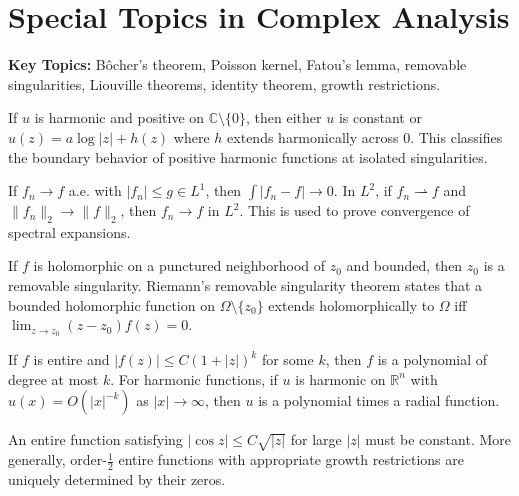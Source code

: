 \section{Special Topics in Complex Analysis}

\textbf{Key Topics:} Bôcher's theorem, Poisson kernel, Fatou's lemma, removable singularities, Liouville theorems, identity theorem, growth restrictions.

\begin{example}
If $u$ is harmonic and positive on $\mathbb{C} \setminus \{0\}$, then either $u$ is constant or $u(z) = a\log|z| + h(z)$ where $h$ extends harmonically across $0$. This classifies the boundary behavior of positive harmonic functions at isolated singularities.
\end{example}

\begin{example}
If $f_n \to f$ a.e. with $|f_n| \leq g \in L^1$, then $\int |f_n - f| \to 0$. In $L^2$, if $f_n \rightharpoonup f$ and $\|f_n\|_2 \to \|f\|_2$, then $f_n \to f$ in $L^2$. This is used to prove convergence of spectral expansions.
\end{example}

\begin{example}
If $f$ is holomorphic on a punctured neighborhood of $z_0$ and bounded, then $z_0$ is a removable singularity. Riemann's removable singularity theorem states that a bounded holomorphic function on $\Omega \setminus \{z_0\}$ extends holomorphically to $\Omega$ iff $\lim_{z\to z_0} (z-z_0)f(z) = 0$.
\end{example}

\begin{example}
If $f$ is entire and $|f(z)| \leq C(1+|z|)^k$ for some $k$, then $f$ is a polynomial of degree at most $k$. For harmonic functions, if $u$ is harmonic on $\mathbb{R}^n$ with $u(x) = O(|x|^{-k})$ as $|x| \to \infty$, then $u$ is a polynomial times a radial function.
\end{example}

\begin{example}
An entire function satisfying $|\cos z| \leq C\sqrt{|z|}$ for large $|z|$ must be constant. More generally, order-$\frac{1}{2}$ entire functions with appropriate growth restrictions are uniquely determined by their zeros.
\end{example}

